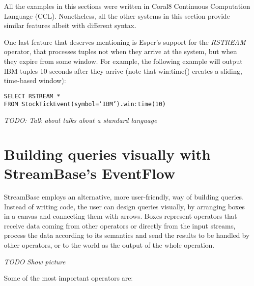 \documentclass[twoside]{report}
\begin{document}
All the examples in this sections were written in Coral8 Continuous Computation Language (CCL). Nonetheless, all the other systems in this section provide similar features albeit with different syntax.

One last feature that deserves mentioning is Esper's support for the \emph{RSTREAM} operator, that processes tuples not when they arrive at the system, but when they expire from some window. For example, the following example will output IBM tuples 10 seconds after they arrive (note that win:time() creates a sliding, time-based window):

\begin{verbatim}
SELECT RSTREAM *
FROM StockTickEvent(symbol=’IBM’).win:time(10)
\end{verbatim}

\emph{TODO: Talk about talks about a standard language}

\section{Building queries visually with StreamBase's EventFlow}

StreamBase employs an alternative, more user-friendly, way of building queries. Instead of writing code, the user can design queries visually, by arranging boxes in a canvas and connecting them with arrows. Boxes represent operators that receive data coming from other operators or directly from the input streams, process the data according to its semantics and send the results to be handled by other operators, or to the world as the output of the whole operation.

\emph{TODO Show picture}

Some of the most important operators are:
\end{document}

